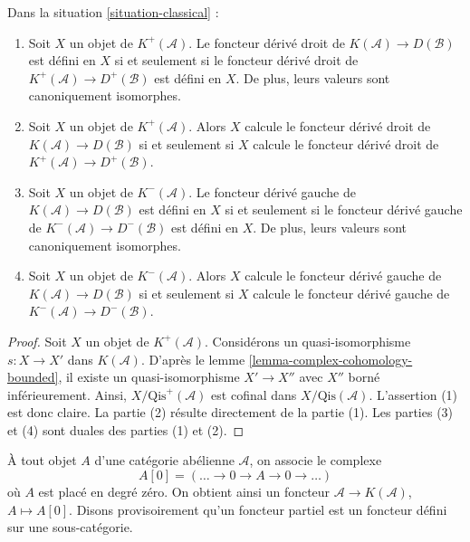 \begin{lemma}
\label{lemma-irrelevant}
Dans la situation \ref{situation-classical} :
\begin{enumerate}
\item Soit $X$ un objet de $K^{+}(\mathcal{A})$. Le foncteur dérivé droit de
$K(\mathcal{A}) \to D(\mathcal{B})$ est défini en $X$ si et seulement si le
foncteur dérivé droit de
$K^{+}(\mathcal{A}) \to D^{+}(\mathcal{B})$ est défini en $X$. De plus, leurs
valeurs sont canoniquement isomorphes.
\item Soit $X$ un objet de $K^{+}(\mathcal{A})$. Alors $X$ calcule le foncteur
dérivé droit de $K(\mathcal{A}) \to D(\mathcal{B})$ si et seulement si $X$
calcule le foncteur dérivé droit de
$K^{+}(\mathcal{A}) \to D^{+}(\mathcal{B})$.
\item Soit $X$ un objet de $K^{-}(\mathcal{A})$. Le foncteur dérivé gauche de
$K(\mathcal{A}) \to D(\mathcal{B})$ est défini en $X$ si et seulement si le
foncteur dérivé gauche de
$K^{-}(\mathcal{A}) \to D^{-}(\mathcal{B})$ est défini en $X$. De plus, leurs
valeurs sont canoniquement isomorphes.
\item Soit $X$ un objet de $K^{-}(\mathcal{A})$. Alors $X$ calcule le foncteur
dérivé gauche de $K(\mathcal{A}) \to D(\mathcal{B})$ si et seulement si $X$
calcule le foncteur dérivé gauche de
$K^{-}(\mathcal{A}) \to D^{-}(\mathcal{B})$.
\end{enumerate}
\end{lemma}

\begin{proof}
Soit $X$ un objet de $K^{+}(\mathcal{A})$. Considérons un quasi-isomorphisme
$s : X \to X'$ dans $K(\mathcal{A})$. D'après le
lemme \ref{lemma-complex-cohomology-bounded}, il existe un quasi-isomorphisme
$X' \to X''$ avec $X''$ borné inférieurement. Ainsi,
$X/\text{Qis}^+(\mathcal{A})$ est cofinal dans
$X/\text{Qis}(\mathcal{A})$. L'assertion (1) est donc claire. La partie (2)
résulte directement de la partie (1). Les parties (3) et (4) sont duales des
parties (1) et (2).
\end{proof}

\noindent
À tout objet $A$ d'une catégorie abélienne $\mathcal{A}$, on associe le
complexe
$$
A[0] = ( \ldots \to 0 \to A \to 0 \to \ldots )
$$
où $A$ est placé en degré zéro. On obtient ainsi un foncteur
$\mathcal{A} \to K(\mathcal{A})$, $A \mapsto A[0]$. Disons provisoirement
qu'un foncteur partiel est un foncteur défini sur une sous-catégorie.

